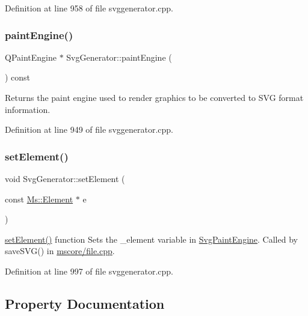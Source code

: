 Definition at line 958 of file svggenerator.\+cpp.

\mbox{\label{class_svg_generator_aaf46976acd7ff8b9544e613d7ecd4887}} 
\subsubsection{\texorpdfstring{paint\+Engine()}{paintEngine()}}
{\footnotesize\ttfamily Q\+Paint\+Engine $\ast$ Svg\+Generator\+::paint\+Engine (\begin{DoxyParamCaption}{ }\end{DoxyParamCaption}) const\hspace{0.3cm}{\ttfamily [protected]}}

Returns the paint engine used to render graphics to be converted to S\+VG format information. 

Definition at line 949 of file svggenerator.\+cpp.

\mbox{\label{class_svg_generator_ad9b70ed3efcb850d93d88e8f7b1a697e}} 
\subsubsection{\texorpdfstring{set\+Element()}{setElement()}}
{\footnotesize\ttfamily void Svg\+Generator\+::set\+Element (\begin{DoxyParamCaption}\item[{const \hyperlink{class_ms_1_1_element}{Ms\+::\+Element} $\ast$}]{e }\end{DoxyParamCaption})}

\hyperlink{class_svg_generator_ad9b70ed3efcb850d93d88e8f7b1a697e}{set\+Element()} function Sets the \+\_\+element variable in \hyperlink{class_svg_paint_engine}{Svg\+Paint\+Engine}. Called by save\+S\+V\+G() in \hyperlink{file_8cpp_source}{mscore/file.\+cpp}. 

Definition at line 997 of file svggenerator.\+cpp.



\subsection{Property Documentation}
\mbox{\label{class_svg_generator_ad59f1e13a42ee64b2d354f29a5255cea}} 
